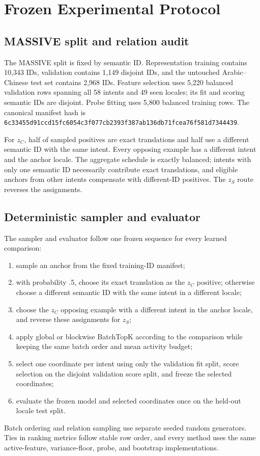 \section{Frozen Experimental Protocol}
\label{app:protocol}

\subsection{MASSIVE split and relation audit}

The MASSIVE split is fixed by semantic ID. Representation training contains 10,343 IDs, validation contains 1,149 disjoint IDs, and the untouched Arabic--Chinese test set contains 2,968 IDs. Feature selection uses 5,220 balanced validation rows spanning all 58 intents and 49 seen locales; its fit and scoring semantic IDs are disjoint. Probe fitting uses 5,800 balanced training rows. The canonical manifest hash is \texttt{6c33455d91ccd15fc6054c3f077cb2393f387ab136db71fcea76f581d7344439}.

For $z_C$, half of sampled positives are exact translations and half use a different semantic ID with the same intent. Every opposing example has a different intent and the anchor locale. The aggregate schedule is exactly balanced; intents with only one semantic ID necessarily contribute exact translations, and eligible anchors from other intents compensate with different-ID positives. The $z_S$ route reverses the assignments.

\subsection{Deterministic sampler and evaluator}

The sampler and evaluator follow one frozen sequence for every learned comparison:
\begin{enumerate}
\item sample an anchor from the fixed training-ID manifest;
\item with probability .5, choose its exact translation as the $z_C$ positive; otherwise choose a different semantic ID with the same intent in a different locale;
\item choose the $z_C$ opposing example with a different intent in the anchor locale, and reverse these assignments for $z_S$;
\item apply global or blockwise BatchTopK according to the comparison while keeping the same batch order and mean activity budget;
\item select one coordinate per intent using only the validation fit split, score selection on the disjoint validation score split, and freeze the selected coordinates;
\item evaluate the frozen model and selected coordinates once on the held-out locale test split.
\end{enumerate}
Batch ordering and relation sampling use separate seeded random generators. Ties in ranking metrics follow stable row order, and every method uses the same active-feature, variance-floor, probe, and bootstrap implementations.

